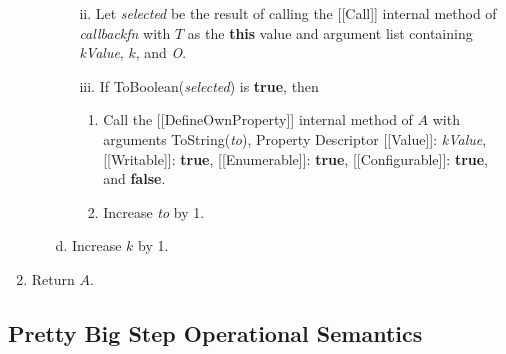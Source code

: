 \documentclass[a4paper,11pt,twoside]{report}
\begin{document}
\begin{enumerate}
\begin{enumerate}
\begin{enumerate}
\item[ii.] Let \textit{selected} be the result of calling the [[Call]] internal method of \textit{callbackfn} with $T$ as the \textbf{this} value and argument list containing \textit{kValue}, $k$, and \textit{O}.
\item[iii.] If ToBoolean(\textit{selected}) is \textbf{true}, then
\begin{enumerate}
\item Call the [[DefineOwnProperty]] internal method of $A$ with arguments ToString(\textit{to}), Property Descriptor {[[Value]]: \textit{kValue}, [[Writable]]: \textbf{true}, [[Enumerable]]: \textbf{true}, [[Configurable]]: \textbf{true}}, and \textbf{false}.
\item Increase \textit{to} by 1.
\end{enumerate}
\end{enumerate}
\item[d.] Increase $k$ by 1.
\end{enumerate}
\item Return $A$.
\end{enumerate}

\subsection{Pretty Big Step Operational Semantics}
\end{document}
